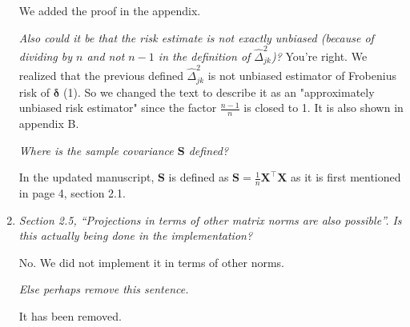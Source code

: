\documentclass[12pt]{article}
\def\bs{\boldsymbol}
\begin{document}
\begin{enumerate}
We added the proof in the appendix.

\emph{Also could it be that the risk estimate is not exactly unbiased (because of dividing by $n$ and not $n-1$ in the definition of $\hat{\Delta}_{jk}^2$)?}
You're right. We realized that the previous defined $\hat{\Delta}_{jk}^2$ is not unbiased estimator of Frobenius risk of $\bs{\delta}$ (1). So we changed the text to describe it as an "approximately unbiased risk estimator" since the factor $\frac{n-1}{n}$ is closed to 1. It is also shown in appendix B.

\emph{Where is the sample covariance $\bs{S}$ defined?}

In the updated manuscript, $\bs{S}$ is defined as $\bs{S} = \frac{1}{n}\bs{X}^\top \bs{X}$ as it is first mentioned in page 4, section 2.1.

\item \emph{Section 2.5, “Projections in terms of other matrix norms are also possible”. Is this actually being done in the implementation?}

No. We did not implement it in terms of other norms.

\emph{Else perhaps remove this sentence.}

It has been removed.
\end{enumerate}
\end{document}
